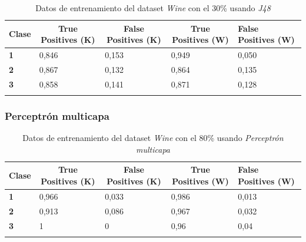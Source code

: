 \documentclass[10pt,a4paper]{article}
\begin{document}
\begin{table}[h!]
	\begin{tabular}{lllll}
		\hline
		\multicolumn{1}{|c|}{\textbf{Clase}} & \multicolumn{1}{c|}{\textbf{True Positives (K)}} & \multicolumn{1}{c|}{\textbf{False Positives (K)}} & \multicolumn{1}{c|}{\textbf{True Positives (W)}} & \multicolumn{1}{l|}{\textbf{False Positives (W)}} \\ \hline
		\multicolumn{1}{|l|}{\textbf{1}} & \multicolumn{1}{l|}{0,846}          & \multicolumn{1}{l|}{0,153}          & \multicolumn{1}{l|}{0,949}          & \multicolumn{1}{l|}{0,050} \\ \hline
		\multicolumn{1}{|l|}{\textbf{2}} & \multicolumn{1}{l|}{0,867}          & \multicolumn{1}{l|}{0,132}          & \multicolumn{1}{l|}{0,864}          & \multicolumn{1}{l|}{0,135} \\ \hline
		\multicolumn{1}{|l|}{\textbf{3}} & \multicolumn{1}{l|}{0,858}          & \multicolumn{1}{l|}{0,141}          & \multicolumn{1}{l|}{0,871}          & \multicolumn{1}{l|}{0,128}\\ \hline
		\textbf{}                       &                                &                                &                                &                      
		
	\end{tabular}
	\caption{Datos de entrenamiento del dataset \emph{Wine} con el 30\% usando \emph{J48}}
	\label{tab:wine_j48_30}
\end{table}
\subsubsection{Perceptrón multicapa}
\begin{table}[h!]
	\begin{tabular}{lllll}
		\hline
		\multicolumn{1}{|c|}{\textbf{Clase}} & \multicolumn{1}{c|}{\textbf{True Positives (K)}} & \multicolumn{1}{c|}{\textbf{False Positives (K)}} & \multicolumn{1}{c|}{\textbf{True Positives (W)}} & \multicolumn{1}{l|}{\textbf{False Positives (W)}} \\ \hline
		\multicolumn{1}{|l|}{\textbf{1}} & \multicolumn{1}{l|}{0,966}          & \multicolumn{1}{l|}{0,033}          & \multicolumn{1}{l|}{0,986}          & \multicolumn{1}{l|}{0,013} \\ \hline
		\multicolumn{1}{|l|}{\textbf{2}} & \multicolumn{1}{l|}{0,913}          & \multicolumn{1}{l|}{0,086}          & \multicolumn{1}{l|}{0,967}          & \multicolumn{1}{l|}{0,032} \\ \hline
		\multicolumn{1}{|l|}{\textbf{3}} & \multicolumn{1}{l|}{1}          & \multicolumn{1}{l|}{0}          & \multicolumn{1}{l|}{0,96}          & \multicolumn{1}{l|}{0,04}\\ \hline
		\textbf{}                       &                                &                                &                                &                      
		
	\end{tabular}
	\caption{Datos de entrenamiento del dataset \emph{Wine} con el 80\% usando \emph{Perceptrón multicapa}}
	\label{tab:wine_percep_80}
\end{table}
\end{document}
